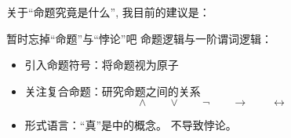 \begin{frame}{关于``命题究竟是什么'', 我目前的建议是：}
\end{frame}

\begin{frame}{暂时忘掉``命题''与``悖论''吧}
  命题逻辑与一阶谓词逻辑：
  \begin{itemize}
    \item 引入命题符号：将命题视为原子
    \item 关注复合命题：研究命题之间的关系 
      \[
	\land \qquad \lor \qquad \lnot \qquad \to \qquad \leftrightarrow
      \]
    \item 形式语言：``真''是中的概念。 不导致悖论。
  \end{itemize}
\end{frame}
